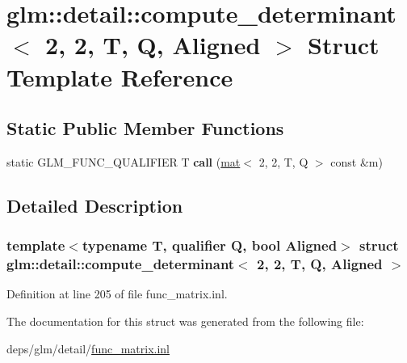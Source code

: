 \hypertarget{structglm_1_1detail_1_1compute__determinant_3_012_00_012_00_01T_00_01Q_00_01Aligned_01_4}{}\section{glm\+:\+:detail\+:\+:compute\+\_\+determinant$<$ 2, 2, T, Q, Aligned $>$ Struct Template Reference}
\label{structglm_1_1detail_1_1compute__determinant_3_012_00_012_00_01T_00_01Q_00_01Aligned_01_4}
\subsection*{Static Public Member Functions}
\begin{DoxyCompactItemize}
\item 
\mbox{\label{structglm_1_1detail_1_1compute__determinant_3_012_00_012_00_01T_00_01Q_00_01Aligned_01_4_a850cf8b2da3cde11c2b1c3c972927d6d}} 
static G\+L\+M\+\_\+\+F\+U\+N\+C\+\_\+\+Q\+U\+A\+L\+I\+F\+I\+ER T {\bfseries call} (\hyperlink{structglm_1_1mat}{mat}$<$ 2, 2, T, Q $>$ const \&m)
\end{DoxyCompactItemize}


\subsection{Detailed Description}
\subsubsection*{template$<$typename T, qualifier Q, bool Aligned$>$\newline
struct glm\+::detail\+::compute\+\_\+determinant$<$ 2, 2, T, Q, Aligned $>$}



Definition at line 205 of file func\+\_\+matrix.\+inl.



The documentation for this struct was generated from the following file\+:\begin{DoxyCompactItemize}
\item 
deps/glm/detail/\hyperlink{func__matrix_8inl}{func\+\_\+matrix.\+inl}\end{DoxyCompactItemize}
